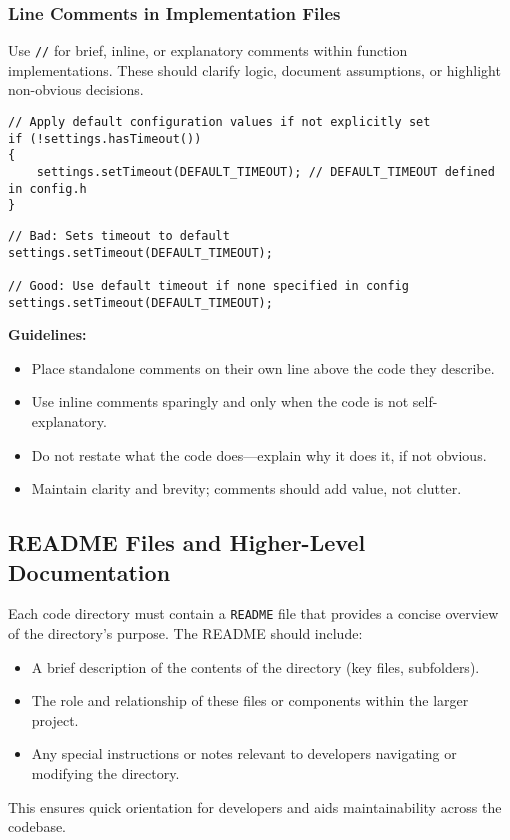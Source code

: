 \subsubsection*{Line Comments in Implementation Files}

Use \texttt{//} for brief, inline, or explanatory comments within function implementations. These should clarify logic, document assumptions, or highlight non-obvious decisions.
\begin{lstlisting}[style=cppstyle]
// Apply default configuration values if not explicitly set
if (!settings.hasTimeout()) 
{
    settings.setTimeout(DEFAULT_TIMEOUT); // DEFAULT_TIMEOUT defined in config.h
}
\end{lstlisting}
\begin{lstlisting}[style=cppstyle]
// Bad: Sets timeout to default
settings.setTimeout(DEFAULT_TIMEOUT);

// Good: Use default timeout if none specified in config
settings.setTimeout(DEFAULT_TIMEOUT);
\end{lstlisting}
\textbf{Guidelines:}
\begin{itemize}
    \item Place standalone comments on their own line above the code they describe.
    \item Use inline comments sparingly and only when the code is not self-explanatory.
    \item Do not restate what the code does—explain why it does it, if not obvious.
    \item Maintain clarity and brevity; comments should add value, not clutter.
\end{itemize}



\subsection{README Files and Higher-Level Documentation}

Each code directory must contain a \texttt{README} file that provides a concise overview of the directory’s purpose. The README should include:
\begin{itemize}
    \item A brief description of the contents of the directory (key files, subfolders).
    \item The role and relationship of these files or components within the larger project.
    \item Any special instructions or notes relevant to developers navigating or modifying the directory.
\end{itemize}
This ensures quick orientation for developers and aids maintainability across the codebase.

